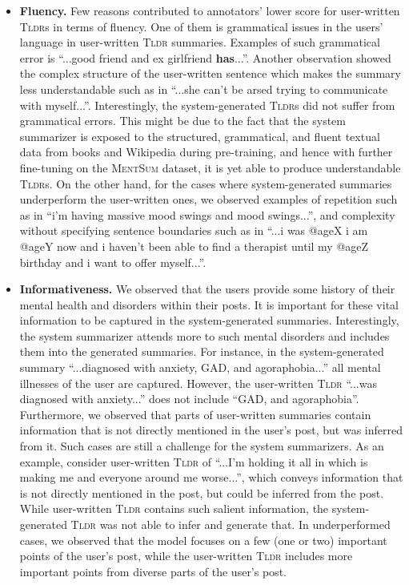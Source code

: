\documentclass[10pt, a4paper]{article}
\newcommand{\tldr}{\textsc{Tldr}}
\newcommand{\mentsum}{\textsc{MentSum}}
\begin{document}
\begin{itemize}[leftmargin=*,label={-}]

    \item \textbf{Fluency. } Few reasons contributed to annotators' lower score for user-written \tldr s in terms of fluency. One of them is grammatical issues in the users' language in user-written \tldr{} summaries. Examples of such grammatical error is ``{\selectfont ...good friend and ex girlfriend \textbf{has}...}''. Another observation showed the complex structure of the user-written sentence which makes the summary less understandable such as in ``{\selectfont ...she can't be arsed trying to communicate with myself...}''. Interestingly, the system-generated \tldr s did not suffer from grammatical errors. This might be due to the fact that the system summarizer is exposed to the structured, grammatical, and fluent textual data from books and Wikipedia during pre-training, and hence with further fine-tuning on the \mentsum{} dataset, it is yet able to produce understandable \tldr s. On the other hand, for the cases where system-generated summaries underperform the user-written ones, we observed examples of repetition such as in ``{\selectfont i'm having massive mood swings and mood swings...}'', and complexity without specifying sentence boundaries such as in ``{\selectfont ...i was @ageX i am @ageY now and i haven't been able to find a therapist until my @ageZ birthday and i want to offer myself...}''.
    
    \item \textbf{Informativeness. } We observed that the users provide some history of their mental health and disorders within their posts. It is important for these vital information to be captured in the system-generated summaries. 
Interestingly, the system summarizer attends more to such mental disorders and includes them into the generated summaries.  For instance, in the system-generated summary  ``{\selectfont ...diagnosed with anxiety, GAD, and agoraphobia...}'' 
all mental illnesses of the user are captured.
However, the user-written \tldr{} ``{\selectfont ...was diagnosed with anxiety...}'' does not include ``{\selectfont GAD, and agoraphobia}''. Furthermore, we observed that parts of user-written summaries contain information that is not directly mentioned in the user's post, but was inferred from it. Such cases are still a challenge for the system summarizers. 
As an example, consider user-written \tldr{} of ``{\selectfont ...I'm holding it all in which is making me and everyone around me worse...}'', which conveys information that is not directly mentioned in the post, but could be inferred from the post. While user-written \tldr{} contains such salient information, the system-generated \tldr{} was not able to infer and generate that. In underperformed cases, we observed that the model focuses on a few (one or two) important points of the user’s post, while the user-written \tldr{} includes more important points from diverse parts of the user’s post.


\end{itemize}
\end{document}
